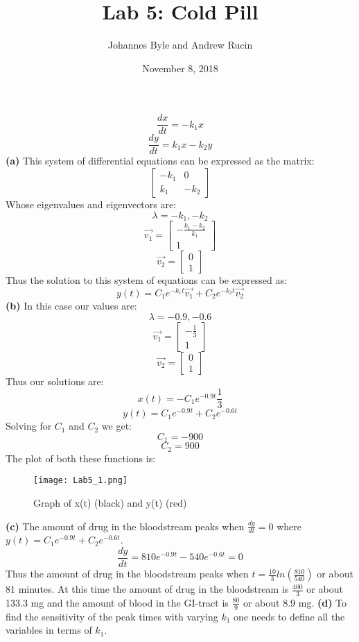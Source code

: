 \documentclass[english]{article}
\begin{document}
\title{Lab 5: Cold Pill}
\author{Johannes Byle and Andrew Rucin}
\date{November 8, 2018}
\maketitle
\begin{flushleft}
$$\frac{dx}{dt}=-k_1x$$
$$\frac{dy}{dt}=k_1x-k_2y$$
\textbf{(a)} This system of differential equations can be expressed as the matrix:
$$
\begin{bmatrix}
-k_1 & 0 \\
k_1 & -k_2
\end{bmatrix}
$$
Whose eigenvalues and eigenvectors are:
$$\lambda = -k_1,-k_2$$
$$
\vec{v_1}=
\begin{bmatrix}
-\frac{k_1-k_2}{k_1}\\
1
\end{bmatrix}
$$
$$
\vec{v_2}=
\begin{bmatrix}
0\\
1
\end{bmatrix}
$$
Thus the solution to this system of equations can be expressed as:
$$y(t)=C_1e^{-k_1t}\vec{v_1}+C_2e^{-k_2t}\vec{v_2}$$
\textbf{(b)} In this case our values are:
$$\lambda = -0.9,-0.6$$
$$
\vec{v_1}=
\begin{bmatrix}
-\frac{1}{3}\\
1
\end{bmatrix}
$$
$$
\vec{v_2}=
\begin{bmatrix}
0\\
1
\end{bmatrix}
$$
Thus our solutions are:
$$x(t)=-C_1e^{-0.9t}\frac{1}{3}$$
$$y(t)=C_1e^{-0.9t}+C_2e^{-0.6t}$$
Solving for $C_1$ and $C_2$ we get:
$$C_1=-900$$
$$C_2=900$$
The plot of both these functions is:
\begin{figure}[H]
\begin{center}
\texttt{[image: Lab5\_1.png]}
\end{center}
\caption{Graph of x(t) (black) and y(t) (red)}
\end{figure}
\textbf{(c)} The amount of drug in the bloodstream peaks when $\frac{dy}{dt}=0$ where $y(t)=C_1e^{-0.9t}+C_2e^{-0.6t}$.
$$\frac{dy}{dt}=810e^{-0.9t}-540e^{-0.6t}=0$$
Thus the amount of drug in the bloodstream peaks when $t=\frac{10}{3}ln(\frac{810}{540})$ or about 81 minutes. At this time the amount of drug in the bloodstream is $\frac{400}{3}$ or about 133.3
mg and the amount of blood in the GI-tract is $\frac{80}{9}$ or about 8.9 mg.
\linebreak
\textbf{(d)} To find the sensitivity of the peak times with varying $k_1$ one needs to define all the variables in terms of $k_1$.

\end{flushleft}
\end{document}
